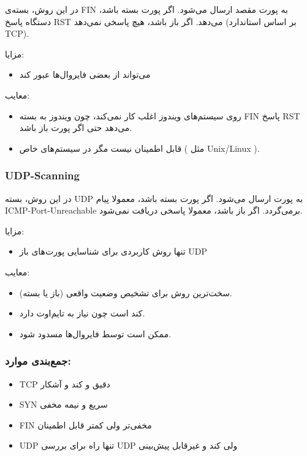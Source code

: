 در این روش، بسته‌ی FIN به پورت مقصد ارسال می‌شود. اگر پورت بسته باشد، دستگاه پاسخ RST می‌دهد. اگر باز باشد، هیچ پاسخی نمی‌دهد (بر اساس استاندارد TCP).

مزایا:

\begin{itemize}
    \item می‌تواند از بعضی فایروال‌ها عبور کند
\end{itemize}

معایب:

\begin{itemize}
    \item روی سیستم‌های ویندوز اغلب کار نمی‌کند، چون ویندوز به بسته FIN پاسخ RST می‌دهد حتی اگر پورت باز باشد.
    \item قابل اطمینان نیست مگر در سیستم‌های خاص ( مثل Unix/Linux ).
\end{itemize}


\subsubsection*{UDP-Scanning}

در این روش، بسته UDP به پورت ارسال می‌شود. اگر پورت بسته باشد، معمولا پیام ICMP-Port-Unreachable برمی‌گردد. اگر باز باشد، معمولا پاسخی دریافت نمی‌شود.

مزایا:

\begin{itemize}
    \item تنها روش کاربردی برای شناسایی پورت‌های باز UDP
\end{itemize}

معایب:

\begin{itemize}
    \item سخت‌ترین روش برای تشخیص وضعیت واقعی (باز یا بسته).
    \item کند است چون نیاز به تایم‌اوت دارد.
    \item ممکن است توسط فایروال‌ها مسدود شود.
\end{itemize}


\subsubsection*{جمع‌بندی موارد:}

\begin{itemize}
    \item TCP
    دقیق و کند و آشکار
    \item SYN
    سریع و نیمه مخفی
    \item FIN
    مخفی‌تر ولی کمتر قابل اطمینان
    \item UDP
    تنها راه برای بررسی UDP ولی کند و غیرقابل پیش‌بینی
\end{itemize}



